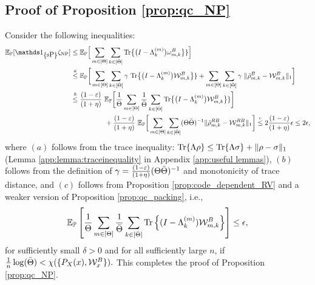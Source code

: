 \subsection{Proof of Proposition \ref{prop:qc_NP}}
\label{app:prop:proof:qc_NP}
Consider the following inequalities:
\begin{align*}
    \EE_\PP[\I_{\curly{\mbox{\normalfont sP}}}\zeta_{\text{NP}}] &\leq \EE_\PP\Big[\sum_{m \in [\Theta]}\sum_{\substack{k\in [\bTheta]}}
\Tr\big\{\big(I-\dpovm_{k}^{(m)} \big)\omega^{B}_{m,k}\big\}\}\Big]\\
&\overset{a}{\leq} \EE_\PP\bigg[\sum_{m \in [\Theta]}\sum_{\substack{k\in [\bTheta]}}\gamma\ \Tr\big\{\big(I-\dpovm_{k}^{(m)} \big)\calW^{B}_{m,k}\big\}\} + \sum_{m \in [\Theta]}\sum_{\substack{k\in [\bTheta]}}\gamma\ \|\rhotilde^B_{m,k}-\calW^B_{m,k}\|_1\bigg]\\
&\overset{b}{\leq} \frac{(1-\varepsilon)}{(1+\eta)}\ \EE_\PP\bigg[\frac{1}{\Theta}\sum_{m \in [\Theta]}\frac{1}{\bTheta}\sum_{\substack{k\in [\bTheta]}}
\Tr\big\{\big(I-\dpovm_{k}^{(m)} \big)\calW^{B}_{m,k}\big\}\}\bigg]\\
&\hspace{50pt}+ \frac{(1-\varepsilon)}{(1+\eta)}\ \EE_\PP\bigg[\sum_{m \in [\Theta]}\sum_{\substack{k\in [\bTheta]}}
(\Theta\bTheta)^{-1}\|\rhotilde^{\refe B}_{m,k}-\calW^{\refe B}_{m,k}\|_1\bigg]\overset{c}{\leq} 2 \frac{(1-\varepsilon)}{(1+\eta)}\epsilon \leq 2\epsilon,
\end{align*}
where $(a)$ follows from the trace inequality: $\text{Tr}\{\Lambda \rho\} \leq \text{Tr}\{\Lambda \sigma\}+\|\rho-\sigma\|_1$ (Lemma \ref{app:lemma:traceinequality} in Appendix \ref{app:useful lemmas}), $(b)$ follows from the definition of  $\gamma = \frac{(1-\varepsilon)}{(1+\eta)}(\Theta\bar{\Theta})^{-1}$ and monotonicity of trace distance, and $(c)$ follows from Proposition \ref{prop:code_dependent_RV} and a weaker version of Proposition \ref{prop:qc_packing}, i.e., 
\begin{equation}\label{eqn:qc_packing}
    \mathbb{E}_{\mathbb{P}}\left[\frac{1}{\Theta}\sum_{m\in [\Theta]}\frac{1}{\bar{\Theta}}\sum_{k\in[\bar{\Theta}]} \text{Tr}\left\{(I-\Lambda_{k}^{(m)})\mathcal{W}_{m,k}^B\right\}\right] \leq \epsilon,
\end{equation}
for sufficiently small $\delta>0$ and for all sufficiently large $n$, if $\frac{1}{n}\log(\bar{\Theta})<\chi(\{P_X(x),\mathcal{W}^B_x\}).$
This completes the proof of Proposition \ref{prop:qc_NP}. 

